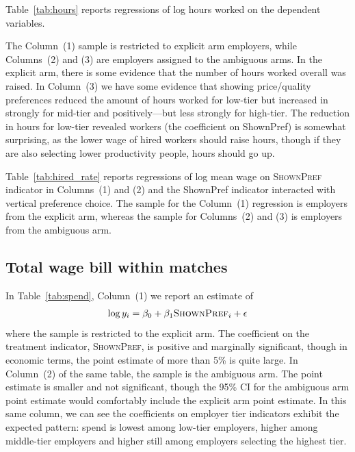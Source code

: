 Table~\ref{tab:hours} reports regressions of log hours worked on the dependent variables. 

The Column~(1) sample is restricted to explicit arm employers, while Columns~(2) and (3) are employers assigned to the ambiguous arms. 
In the explicit arm, there is some evidence that the number of hours worked overall was raised. 
In Column~(3) we have some evidence that showing price/quality preferences reduced the amount of hours worked for low-tier but increased in strongly for mid-tier and positively---but less strongly for high-tier.
The reduction in hours for low-tier revealed workers (the coefficient on ShownPref) is somewhat surprising, as the lower wage of hired workers should raise hours, though if they are also selecting lower productivity people, hours should go up. 



Table~\ref{tab:hired_rate} reports regressions of log mean wage on \textsc{ShownPref} indicator in Columns~(1) and (2) and the ShownPref indicator interacted with vertical preference choice. 
The sample for the Column~(1) regression is employers from the explicit arm, whereas the sample for Columns~(2) and (3) is employers from the ambiguous arm.  



\subsection{Total wage bill within matches} 

In Table~\ref{tab:spend}, Column~(1) we report an estimate of 
\begin{align} \label{eq:spend} 
  \log y_i = \beta_0 + \beta_1 \textsc{ShownPref}_i + \epsilon
\end{align} 
where the sample is restricted to the explicit arm.
The coefficient on the treatment indicator, \textsc{ShownPref}, is positive and marginally significant, though in economic terms, the point estimate of more than 5\% is quite large.
In Column~(2) of the same table, the sample is the ambiguous arm. 
The point estimate is smaller and not significant, though the 95\% CI for the ambiguous arm point estimate would comfortably include the explicit arm point estimate. 
In this same column, we can see the coefficients on employer tier indicators exhibit the expected pattern:
spend is lowest among low-tier employers, higher among middle-tier employers and higher still among employers selecting the highest tier. 

